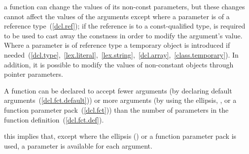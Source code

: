 \pnum
\begin{note}
%
%
%
%
%
%
a function can change the values of its non-const parameters, but these
changes cannot affect the values of the arguments except where a
parameter is of a reference type~(\ref{dcl.ref}); if the reference is to
a const-qualified type,  is required to be used to
cast away the constness in order to modify the argument's value. Where a
parameter is of  reference type a temporary object is
introduced if
needed~(\ref{dcl.type},~\ref{lex.literal},~\ref{lex.string},~\ref{dcl.array},~\ref{class.temporary}).
In addition, it is possible to modify the values of non-constant objects through
pointer parameters.
\end{note}

\pnum
{}%
%
A function can be declared to accept fewer arguments (by declaring default
arguments~(\ref{dcl.fct.default})) or more arguments (by using the ellipsis,
, or a function parameter pack~(\ref{dcl.fct})) than the number of
parameters in the function definition~(\ref{dcl.fct.def}).
\begin{note}
this implies that, except where the ellipsis () or a function
parameter pack is used, a parameter is available for each argument.
\end{note}

